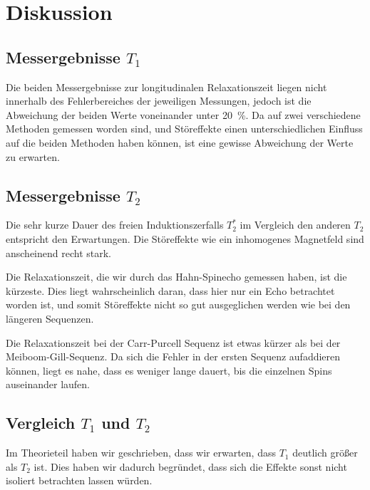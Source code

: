 \fehlt


\chapter{Diskussion}

\section{Messergebnisse $T_1$}

Die beiden Messergebnisse zur longitudinalen Relaxationszeit liegen nicht
innerhalb des Fehlerbereiches der jeweiligen Messungen, jedoch ist die
Abweichung der beiden Werte voneinander unter \SI{20}{\percent}. Da auf zwei
verschiedene Methoden gemessen worden sind, und Störeffekte einen
unterschiedlichen Einfluss auf die beiden Methoden haben können, ist eine
gewisse Abweichung der Werte zu erwarten.

\section{Messergebnisse $T_2$}

Die sehr kurze Dauer des freien Induktionszerfalls $T_2^*$ im Vergleich den
anderen $T_2$ entspricht den Erwartungen. Die Störeffekte wie ein inhomogenes
Magnetfeld sind anscheinend recht stark.

Die Relaxationszeit, die wir durch das Hahn-Spinecho gemessen haben, ist die
kürzeste. Dies liegt wahrscheinlich daran, dass hier nur ein Echo betrachtet
worden ist, und somit Störeffekte nicht so gut ausgeglichen werden wie bei den
längeren Sequenzen.

Die Relaxationszeit bei der Carr-Purcell Sequenz ist etwas kürzer als bei der
Meiboom-Gill-Sequenz. Da sich die Fehler in der ersten Sequenz aufaddieren
können, liegt es nahe, dass es weniger lange dauert, bis die einzelnen Spins
auseinander laufen.

\section{Vergleich $T_1$ und $T_2$}

Im Theorieteil haben wir geschrieben, dass wir erwarten, dass $T_1$ deutlich
größer als $T_2$ ist. Dies haben wir dadurch begründet, dass sich die Effekte
sonst nicht isoliert betrachten lassen würden.

